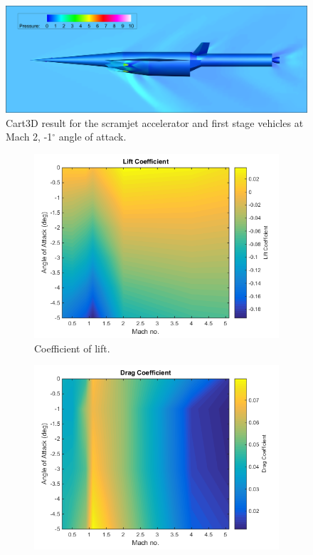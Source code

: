   
  
  
   \begin{figure}[ht]
   	\centering
   	\includegraphics[width=0.8\linewidth]{figures/3_vehicle_design/CARTcontour}
   	\caption{Cart3D result for the scramjet accelerator and first stage vehicles at Mach 2, -1$^\circ$ angle of attack.}
   	\label{fig:CARTcontour}
   \end{figure}
   
    
    \begin{figure}[ht]
    	\begin{subfigure}{.5\textwidth}
    		\centering
    		\includegraphics[width=0.99\linewidth]{figures/3_vehicle_design/FirstStageCl}
    		\caption{Coefficient of lift.}
    		\label{fig:Cl-FirstStage}
    	\end{subfigure}
    	\begin{subfigure}{.5\textwidth}
    		\centering
    		\includegraphics[width=0.99\linewidth]{figures/3_vehicle_design/FirstStageCd}

\end{subfigure}
\end{figure}
